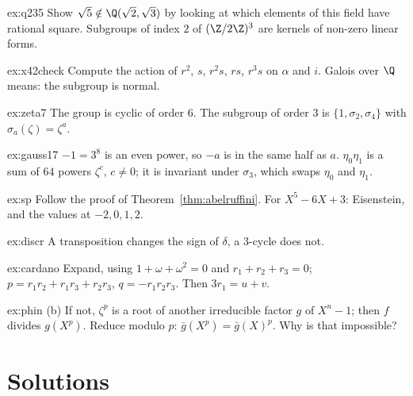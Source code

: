 \begin{hint}{ex:q235}
Show $\sqrt5\notin\Q(\sqrt2,\sqrt3)$ by looking at which elements of this field have rational square. Subgroups of index $2$ of $(\Z/2\Z)^3$ are kernels of non-zero linear forms.
\end{hint}
\begin{hint}{ex:x42check}
Compute the action of $r^2$, $s$, $r^2s$, $rs$, $r^3s$ on $\alpha$ and $i$. Galois over $\Q$ means: the subgroup is normal.
\end{hint}
\begin{hint}{ex:zeta7}
The group is cyclic of order $6$. The subgroup of order $3$ is $\{1,\sigma_2,\sigma_4\}$ with $\sigma_a(\zeta)=\zeta^a$.
\end{hint}
\begin{hint}{ex:gauss17}
$-1=3^8$ is an even power, so $-a$ is in the same half as $a$. $\eta_0\eta_1$ is a sum of $64$ powers $\zeta^c$, $c\ne0$; it is invariant under $\sigma_3$, which swaps $\eta_0$ and $\eta_1$.
\end{hint}
\begin{hint}{ex:sp}
Follow the proof of Theorem~\ref{thm:abelruffini}. For $X^5-6X+3$: Eisenstein, and the values at $-2,0,1,2$.
\end{hint}
\begin{hint}{ex:discr}
A transposition changes the sign of $\delta$, a $3$-cycle does not.
\end{hint}
\begin{hint}{ex:cardano}
Expand, using $1+\omega+\omega^2=0$ and $r_1+r_2+r_3=0$; $p=r_1r_2+r_1r_3+r_2r_3$, $q=-r_1r_2r_3$. Then $3r_1=u+v$.
\end{hint}
\begin{hint}{ex:phin}
(b) If not, $\zeta^p$ is a root of another irreducible factor $g$ of $X^n-1$; then $f$ divides $g(X^p)$. Reduce modulo $p$: $\bar g(X^p)=\bar g(X)^p$. Why is that impossible?
\end{hint}

\section{Solutions}

